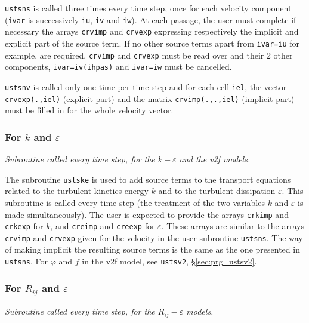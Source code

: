 {{{\texttt{ustsns} is called three times every time
step, once for each velocity component (\texttt{ivar} is successively
\texttt{iu}, \texttt{iv} and \texttt{iw}). At each passage, the user must complete
if necessary the arrays \texttt{crvimp}
and \texttt{crvexp} expressing respectively the implicit and explicit part of
the source term. If no other source terms apart from \texttt{ivar=iu} for
example, are required, \texttt{crvimp} and \texttt{crvexp} must be read over and
their 2 other components, \texttt{ivar=iv(ihpas)} and \texttt{ivar=iw}
must be cancelled.

\texttt{ustsnv} is called only one time per time step and for each cell \texttt{iel},
the vector \texttt{crvexp(.,iel)} (explicit part) and the matrix \texttt{crvimp(.,.,iel)}
(implicit part) must be filled in for the whole velocity vector.


\subsubsection{For $k$ and $\varepsilon$}

\noindent
\textit{Subroutine called every time step, for the $k-\varepsilon$ and
the v2f models.}

The subroutine \texttt{ustske} is used to add source terms to the transport equations
related to the turbulent kinetics energy $k$ and to the turbulent
dissipation $\varepsilon$.
This subroutine is called every time step (the
treatment of the two variables $k$ and $\varepsilon$ is made
simultaneously). The user is expected to provide the arrays \texttt{crkimp} and
\texttt{crkexp} for $k$, and \texttt{creimp} and \texttt{creexp} for
$\varepsilon$. These arrays are similar to the arrays \texttt{crvimp} and
\texttt{crvexp} given for the velocity in the user subroutine \texttt{ustsns}.
The way of making implicit the resulting source terms is the same as the one
presented in \texttt{ustsns}. For $\varphi$ and $\bar{f}$
in the v2f model, see \texttt{ustsv2}, \S\ref{sec:prg_ustsv2}.

\subsubsection{For $R_{ij}$ and $\varepsilon$}

\noindent
\textit{Subroutine called every time step, for the $R_{ij}-\varepsilon$ models.}

}}}
